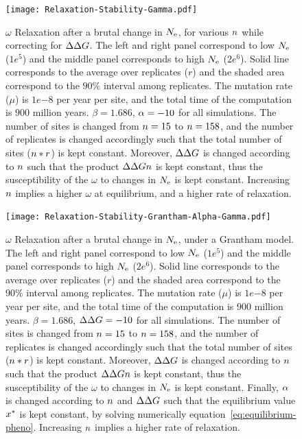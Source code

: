 \begin{figure}[H]
    \centering
    \texttt{[image: Relaxation-Stability-Gamma.pdf]}
    \caption[Relaxation time of $\omega$ dependence on $\NbrSites$, while correction for $\DeltaDeltaG$]{
    $\omega$ Relaxation after a brutal change in $N_{\text{e}}$, for various $\NbrSites$ while correcting for $\DeltaDeltaG$.
    The left and right panel correspond to low $N_{\text{e}}$ ($1e^{5}$) and the middle panel corresponds to high $N_{\text{e}}$ ($2e^{6}$).
    Solid line corresponds to the average over replicates ($r$) and the shaded area correspond to the $90\%$ interval among replicates.
    The mutation rate ($\mu$) is $1e{-8}$ per year per site, and the total time of the computation is $900$ million years.
    $\beta=1.686$, $\alpha=-10$ for all simulations. The number of sites is changed from $n=15$ to $n=158$, and the number of replicates is changed accordingly such that the total number of sites ($n*r$) is kept constant.
    Moreover, $\DeltaDeltaG$ is changed according to $\NbrSites$ such that the product $\Delta \Delta Gn$ is kept constant, thus the susceptibility of the $\omega$ to changes in $N_{\text{e}}$ is kept constant.
    Increasing $\NbrSites$ implies a higher $\omega$ at equilibrium, and a higher rate of relaxation.
    }
\end{figure}

\begin{figure}[H]
    \centering
    \texttt{[image: Relaxation-Stability-Grantham-Alpha-Gamma.pdf]}
    \caption[Relaxation time of $\omega$ for the Grantham model]{
    $\omega$ Relaxation after a brutal change in $N_{\text{e}}$, under a Grantham model.
    The left and right panel correspond to low $N_{\text{e}}$ ($1e^{5}$) and the middle panel corresponds to high $N_{\text{e}}$ ($2e^{6}$).
    Solid line corresponds to the average over replicates ($r$) and the shaded area correspond to the $90\%$ interval among replicates.
    The mutation rate ($\mu$) is $1e{-8}$ per year per site, and the total time of the computation is $900$ million years.
    $\beta=1.686$, $\Delta \Delta G=-10$ for all simulations. The number of sites is changed from $n=15$ to $n=158$, and the number of replicates is changed accordingly such that the total number of sites ($n*r$) is kept constant.
    Moreover, $\DeltaDeltaG$ is changed according to $\NbrSites$ such that the product $\Delta \Delta Gn$ is kept constant, thus the susceptibility of the $\omega$ to changes in $N_{\text{e}}$ is kept constant.
    Finally, $\alpha$ is changed according to $\NbrSites$ and $\DeltaDeltaG$ such that the equilibrium value $x^{*}$ is kept constant, by solving numerically equation~\ref{eq:equilibrium-pheno}.
    Increasing $\NbrSites$ implies a higher rate of relaxation.}
\end{figure}


